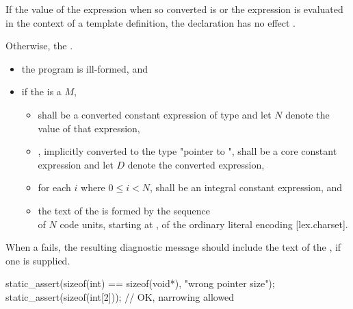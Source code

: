 \documentclass{wg21}
\begin{document}
If the value of the expression  when
so converted is  or the expression is evaluated in the context of a template definition,
the declaration has no effect  .

Otherwise,
the  
.

\begin{addedblock}
\begin{itemize}
\item the program is ill-formed, and
\item if the  is a  $M$,
\begin{itemize}
	\item {} shall be a converted constant expression of type  and let $N$ denote the value of that expression,
	\item {}, implicitly converted to the type "pointer to ", shall be a core constant expression and let $D$ denote the converted expression,
	\item for each $i$ where $0 \le  i < N$,  shall be an integral constant expression, and
	\item the text of the  is formed by the sequence\\
	of $N$ code units, starting at , of the ordinary literal encoding [lex.charset].
\end{itemize}
\end{itemize}
\end{addedblock}

\begin{addedblock}
\recommended

When a  fails, the resulting diagnostic message should
include the text of the , if one is supplied.
\end{addedblock}

\begin{example}
\begin{codeblock}
    static_assert(sizeof(int) == sizeof(void*), "wrong pointer size");
    static_assert(sizeof(int[2]));          // OK, narrowing allowed
\end{codeblock}
\end{example}
\end{document}
